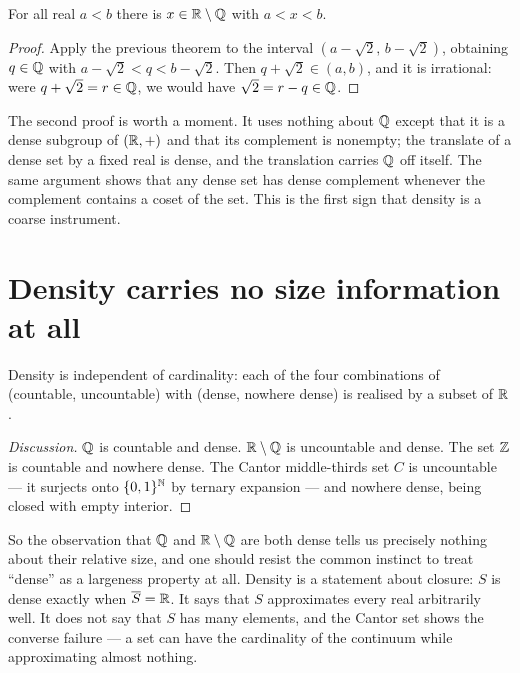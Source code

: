 \documentclass{essay}
\newcommand{\Irr}{\R \setminus \Q}
\begin{document}
\begin{theorem}[Density of $\Irr$]
For all real $a < b$ there is $x \in \Irr$ with $a < x < b$.
\end{theorem}

\begin{proof}
Apply the previous theorem to the interval $(a - \sqrt{2},\, b -
\sqrt{2})$, obtaining $q \in \mathbb{Q}$ with $a - \sqrt{2} < q < b -
\sqrt{2}$. Then $q + \sqrt{2} \in (a,b)$, and it is irrational: were
$q + \sqrt{2} = r \in \mathbb{Q}$, we would have $\sqrt{2} = r - q \in \mathbb{Q}$.
\end{proof}

The second proof is worth a moment. It uses nothing about $\mathbb{Q}$ except
that it is a dense subgroup of $(\mathbb{R},+)$ and that its complement is
nonempty; the translate of a dense set by a fixed real is dense, and
the translation carries $\mathbb{Q}$ off itself. The same argument shows that
any dense set has dense complement whenever the complement contains a
coset of the set. This is the first sign that density is a coarse
instrument.

\section{Density carries no size information at all}

\begin{proposition}
Density is independent of cardinality: each of the four combinations of
(countable, uncountable) with (dense, nowhere dense) is realised by a
subset of $\mathbb{R}$.
\end{proposition}

\begin{proof}[Discussion]
$\mathbb{Q}$ is countable and dense. $\Irr$ is uncountable and dense. The set
$\mathbb{Z}$ is countable and nowhere dense. The Cantor middle-thirds set $C$
is uncountable --- it surjects onto $\{0,1\}^{\mathbb{N}}$ by ternary
expansion --- and nowhere dense, being closed with empty interior.
\end{proof}

So the observation that $\mathbb{Q}$ and $\Irr$ are both dense tells us
precisely nothing about their relative size, and one should resist the
common instinct to treat ``dense'' as a largeness property at all.
Density is a statement about closure: $S$ is dense exactly when
$\overline{S} = \mathbb{R}$. It says that $S$ approximates every real
arbitrarily well. It does not say that $S$ has many elements, and the
Cantor set shows the converse failure --- a set can have the
cardinality of the continuum while approximating almost nothing.
\end{document}
